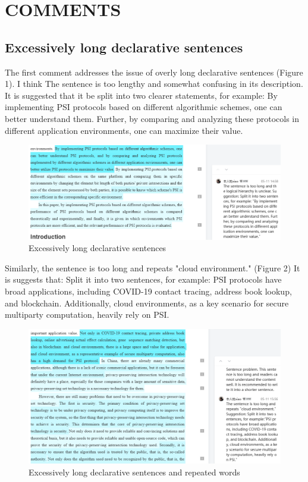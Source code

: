 \documentclass[sigconf]{acmart}
\begin{document}
\section{COMMENTS}

\subsection{Excessively long declarative sentences}

The first comment addresses the issue of overly long declarative sentences (Figure 1). 
I think The sentence is too lengthy and somewhat confusing in its description. 
It is suggested that it be split into two clearer statements, for example:
By implementing PSI protocols based on different algorithmic schemes, one can better understand them. 
Further, by comparing and analyzing these protocols in different application environments, one can maximize their value.

\begin{figure}[h]
  \centering
  \includegraphics[width=\linewidth]{./picture/excessive_1.png}
  \caption{Excessively long declarative sentences}
\end{figure}

Similarly, the sentence is too long and repeats "cloud environment." (Figure 2) It is suggests that: 
Split it into two sentences, for example: 
PSI protocols have broad applications, including COVID-19 contact tracing, 
address book lookup, and blockchain. Additionally, cloud environments, as a key scenario 
for secure multiparty computation, heavily rely on PSI.

\begin{figure}[h]
  \centering
  \includegraphics[width=\linewidth]{./picture/excessive_2.png}
  \caption{Excessively long declarative sentences and repeated words}
\end{figure}
\end{document}
